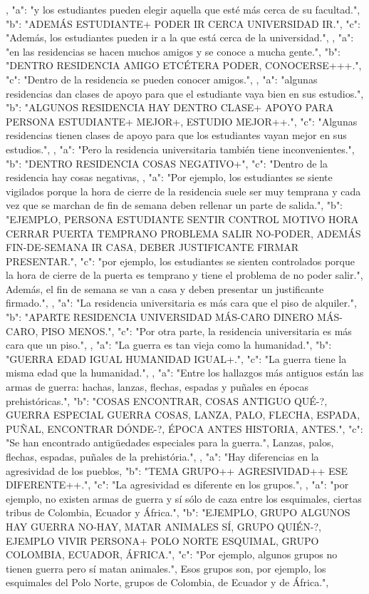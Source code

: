 ,
{
"a": "y los estudiantes pueden elegir aquella que esté más cerca de su facultad.",
"b": "ADEMÁS ESTUDIANTE+ PODER IR CERCA UNIVERSIDAD IR.",
"c": "Además, los estudiantes pueden ir a la que está cerca de la universidad.",
}
,
{
"a": "en las residencias se hacen muchos amigos y se conoce a mucha gente.",
"b": "DENTRO RESIDENCIA AMIGO ETCÉTERA PODER, CONOCERSE+++.",
"c": "Dentro de la residencia se pueden conocer amigos.",
}
,
{
"a": "algunas residencias dan clases de apoyo para que el estudiante vaya bien en sus estudios.",
"b": "ALGUNOS RESIDENCIA HAY DENTRO CLASE+ APOYO PARA PERSONA ESTUDIANTE+ MEJOR+, ESTUDIO MEJOR++.",
"c": "Algunas residencias tienen clases de apoyo para que los estudiantes vayan mejor en sus estudios.",
}
,
{
"a": "Pero la residencia universitaria también tiene inconvenientes.",
"b": "DENTRO RESIDENCIA COSAS NEGATIVO+",
"c": "Dentro de la residencia hay cosas negativas,
}
,
{
"a": "Por ejemplo, los estudiantes se siente vigilados porque la hora de cierre de la residencia suele ser muy temprana y cada vez que se marchan de fin de semana deben rellenar un parte de salida.",
"b": "EJEMPLO, PERSONA ESTUDIANTE SENTIR CONTROL MOTIVO HORA CERRAR PUERTA TEMPRANO PROBLEMA SALIR NO-PODER, ADEMÁS FIN-DE-SEMANA IR CASA, DEBER JUSTIFICANTE FIRMAR PRESENTAR.",
"c": "por ejemplo, los estudiantes se sienten controlados porque la hora de cierre de la puerta es temprano y tiene el problema de no poder salir.", Además, el fin de semana se van a casa y deben presentar un justificante firmado.",
}
,
{
"a": "La residencia universitaria es más cara que el piso de alquiler.",
"b": "APARTE RESIDENCIA UNIVERSIDAD MÁS-CARO DINERO MÁS-CARO, PISO MENOS.",
"c": "Por otra parte, la residencia universitaria es más cara que un piso.",
}
,
{
"a": "La guerra es tan vieja como la humanidad.",
"b": "GUERRA EDAD IGUAL HUMANIDAD IGUAL+.",
"c": "La guerra tiene la misma edad que la humanidad.",
}
,
{
"a": "Entre los hallazgos más antiguos están las armas de guerra: hachas, lanzas, flechas, espadas y puñales en épocas prehistóricas.",
"b": "COSAS ENCONTRAR, COSAS ANTIGUO QUÉ-?, GUERRA ESPECIAL GUERRA COSAS, LANZA, PALO, FLECHA, ESPADA, PUÑAL, ENCONTRAR DÓNDE-?, ÉPOCA ANTES HISTORIA, ANTES.",
"c": "Se han encontrado antigüedades especiales para la guerra.", Lanzas, palos, flechas, espadas, puñales de la prehistória.",
}
,
{
"a": "Hay diferencias en la agresividad de los pueblos,
"b": "TEMA GRUPO++ AGRESIVIDAD++ ESE DIFERENTE++.",
"c": "La agresividad es diferente en los grupos.",
}
,
{
"a": "por ejemplo, no existen armas de guerra y sí sólo de caza entre los esquimales, ciertas tribus de Colombia, Ecuador y África.",
"b": "EJEMPLO, GRUPO ALGUNOS HAY GUERRA NO-HAY, MATAR ANIMALES SÍ, GRUPO QUIÉN-?, EJEMPLO VIVIR PERSONA+ POLO NORTE ESQUIMAL, GRUPO COLOMBIA, ECUADOR, ÁFRICA.",
"c": "Por ejemplo, algunos grupos no tienen guerra pero sí matan animales.", Esos grupos son, por ejemplo, los esquimales del Polo Norte, grupos de Colombia, de Ecuador y de África.",
}
